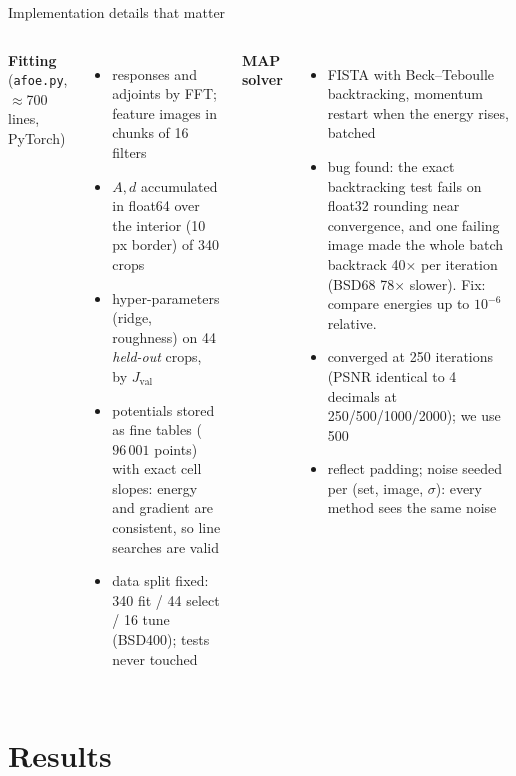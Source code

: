 \documentclass[10pt,aspectratio=169]{beamer}
\begin{document}
\begin{frame}{Implementation details that matter}
\begin{columns}[T]
\textbf{Fitting} (\texttt{afoe.py}, $\approx$700 lines, PyTorch)
\begin{itemize}\small
\item responses and adjoints by FFT; feature images in chunks of 16 filters
\item $A,d$ accumulated in float64 over the interior (10\,px border) of 340 crops
\item hyper-parameters (ridge, roughness) on 44 \emph{held-out} crops, by $J_{\text{val}}$
\item potentials stored as fine tables ($96\,001$ points) with exact cell slopes: energy and
      gradient are consistent, so line searches are valid
\item data split fixed: 340 fit / 44 select / 16 tune (BSD400); tests never touched
\end{itemize}
\textbf{MAP solver}
\begin{itemize}\small
\item FISTA with Beck--Teboulle backtracking, momentum restart when the energy rises, batched
\item \alert{bug found}: the exact backtracking test fails on float32 rounding near convergence,
      and one failing image made the whole batch backtrack 40$\times$ per iteration (BSD68 78$\times$
      slower). Fix: compare energies up to $10^{-6}$ relative.
\item converged at 250 iterations (PSNR identical to 4 decimals at 250/500/1000/2000); we use 500
\item reflect padding; noise seeded per (set, image, $\sigma$): every method sees the same noise
\end{itemize}
\end{columns}
\end{frame}

\section{Results}
\end{document}
